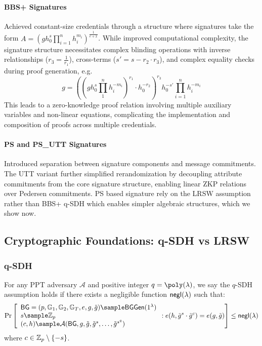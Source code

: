 \paragraph{BBS+ Signatures \cite{hutchison_constant-size_2006}}
Achieved constant-size credentials through a structure where signatures take the form $A = (gh_0^s\prod_{i=1}^n h_i^{m_i})^{\frac{1}{e+x}}$. While \cite{camenisch_anonymous_2016} improved computational complexity, the signature structure necessitates complex blinding operations with inverse relationships ($r_3 = \frac{1}{r_1}$), cross-terms ($s' = s - r_2 \cdot r_3$), and complex equality checks during proof generation, e.g. 
\[
g = ((gh_0^s \prod_1^nh_i^{-m_i})^{r_1} \cdot h_0^{-r_2})^{r_3}h_0^{-s'}\prod_{i=1}^n h_i^{-m_i}
\]
This leads to a zero-knowledge proof relation involving multiple auxiliary variables and non-linear equations, complicating the implementation and composition of proofs across multiple credentials.


\paragraph{PS and PS\_UTT Signatures \cite{sako_short_2016, tomescu2022utt}}
Introduced separation between signature components and message commitments. The UTT variant further simplified rerandomization by decoupling attribute commitments from the core signature structure, enabling linear ZKP relations over Pedersen commitments. PS based signature rely on the LRSW assumption \cite{goos_pseudonym_2000} rather than BBS+ q-SDH which enables simpler algebraic structures, which we show now. 

\subsection{Cryptographic Foundations: q-SDH vs LRSW}

\subsubsection{q-SDH}
\begin{definition}
For any PPT adversary $\mathcal{A}$ and positive integer $q = \poly(\lambda)$, we say the $q$-SDH assumption holds if there exists a negligible function ${\mathsf{negl}(\lambda)}$ such that:
$$\Pr\left[\begin{array}{l}
    \BG = (p, \G_1, \G_2, \G_T, e, g, \tilde{g}) \sample \BGGen(1^\lambda) \\
    s \sample \Z_p \\
    (c, h) \sample \mathcal{A}(\BG, g, \tilde{g}, \tilde{g}^s, \ldots, \tilde{g}^{s^q})
\end{array} : e(h, \tilde{g}^s \cdot \tilde{g}^c) = e(g, \tilde{g})\right] \leq \negl$$
where $c \in \mathbb{Z}_p \setminus \{-s\}$.
\end{definition}


